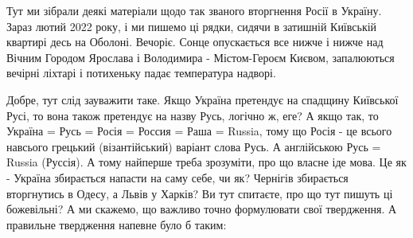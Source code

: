  
 
 
 
 

Тут ми зібрали деякі матеріали щодо так званого вторгнення Росії в Україну.
Зараз лютий 2022 року, і ми пишемо ці рядки, сидячи в затишній Київській
квартирі десь на Оболоні. Вечоріє. Сонце опускається все нижче і нижче над
Вічним Городом Ярослава і Володимира - Містом-Героєм Києвом, запалюються
вечірні ліхтарі і потихеньку падає температура надворі.

Добре, тут слід зауважити таке. Якщо Україна претендує на спадщину Київської
Русі, то вона також претендує на назву Русь, логічно ж, еге? А якщо так, то
Україна = Русь = Росія = Россия = Раша = Russia, тому що Росія - це всього
навсього грецький (візантійський) варіант слова Русь. А англійською Русь =
Russia (Руссія). А тому найперше треба зрозуміти, про що власне іде мова. Це як
- Україна збирається напасти на саму себе, чи як?  Чернігів збирається
вторгнутись в Одесу, а Львів у Харків? Ви тут спитаєте, про що тут пишуть ці
божевільні?  А ми скажемо, що важливо точно формулювати свої твердження. А
правильне твердження напевне було б таким:


